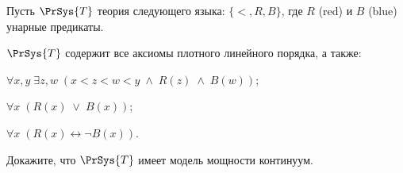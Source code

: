 Пусть $\PrSys{T}$ теория следующего языка: $\{<, R, B\}$, где $R$ (red) и $B$ (blue) унарные предикаты.
    
$\PrSys{T}$ содержит все аксиомы плотного линейного порядка, а также:
\begin{itemtask}
    \item $\forall x, y \; \exists z, w \; (x < z < w < y \; \wedge \; R(z) \; \wedge \; B(w))$;
    \item $\forall x \; (R(x)\; \vee \; B(x))$;
    \item $\forall x \; (R(x) \leftrightarrow \neg B(x))$.
\end{itemtask}
    
Докажите, что $\PrSys{T}$ имеет модель мощности континуум.